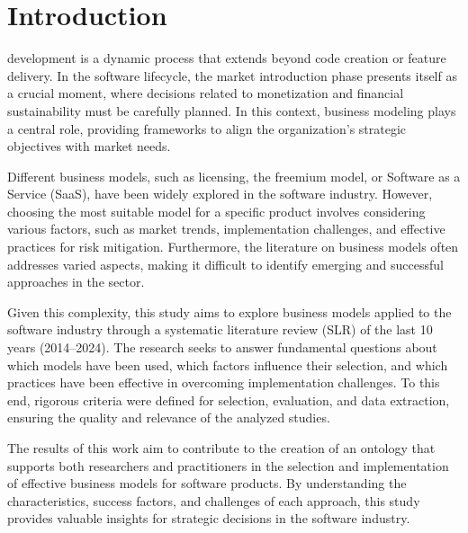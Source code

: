 \documentclass[journal]{IEEEtran}
\begin{document}
\section{Introduction}\label{sec:intro}
%
%
%
%
 development is a dynamic process that extends beyond code creation or feature delivery. In the software lifecycle, the market introduction phase presents itself as a crucial moment, where decisions related to monetization and financial sustainability must be carefully planned. In this context, business modeling plays a central role, providing frameworks to align the organization's strategic objectives with market needs.

Different business models, such as licensing, the freemium model, or Software as a Service (SaaS), have been widely explored in the software industry. However, choosing the most suitable model for a specific product involves considering various factors, such as market trends, implementation challenges, and effective practices for risk mitigation. Furthermore, the literature on business models often addresses varied aspects, making it difficult to identify emerging and successful approaches in the sector.

Given this complexity, this study aims to explore business models applied to the software industry through a systematic literature review (SLR) of the last 10 years (2014--2024). The research seeks to answer fundamental questions about which models have been used, which factors influence their selection, and which practices have been effective in overcoming implementation challenges. To this end, rigorous criteria were defined for selection, evaluation, and data extraction, ensuring the quality and relevance of the analyzed studies.

The results of this work aim to contribute to the creation of an ontology that supports both researchers and practitioners in the selection and implementation of effective business models for software products. By understanding the characteristics, success factors, and challenges of each approach, this study provides valuable insights for strategic decisions in the software industry.
\end{document}
